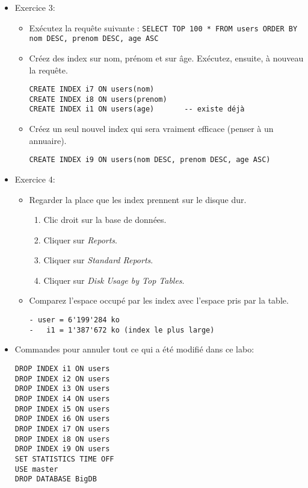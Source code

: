 \documentclass[a4paper]{article}
\begin{document}
\begin{itemize}
\item Exercice 3:
\begin{itemize}
\item Exécutez la requête suivante : \texttt{SELECT TOP 100 * FROM users ORDER BY nom DESC, prenom DESC, age ASC}
\item Créez des index sur nom, prénom et sur âge. Exécutez, ensuite, à nouveau la requête.
\begin{example} \begin{verbatim}
CREATE INDEX i7 ON users(nom)
CREATE INDEX i8 ON users(prenom)
CREATE INDEX i1 ON users(age)       -- existe déjà
\end{verbatim} \end{example}
\item Créez un seul nouvel index qui sera vraiment efficace (penser à un annuaire).
\begin{example} \begin{verbatim}
CREATE INDEX i9 ON users(nom DESC, prenom DESC, age ASC)
\end{verbatim} \end{example}
\end{itemize}



\item Exercice 4:
\begin{itemize}
\item Regarder la place que les index prennent sur le disque dur.
\begin{enumerate}
    \item Clic droit sur la base de données.
    \item Cliquer sur \textit{Reports}.
    \item Cliquer sur \textit{Standard Reports}.
    \item Cliquer sur \textit{Disk Usage by Top Tables}.
\end{enumerate}
\item Comparez l’espace occupé par les index avec l’espace pris par la table.
\begin{example} \begin{verbatim}
- user = 6'199'284 ko
-   i1 = 1'387'672 ko (index le plus large)
\end{verbatim} \end{example}
\end{itemize}



\item Commandes pour annuler tout ce qui a été modifié dans ce labo:
\begin{example} \begin{verbatim}
DROP INDEX i1 ON users
DROP INDEX i2 ON users
DROP INDEX i3 ON users
DROP INDEX i4 ON users
DROP INDEX i5 ON users
DROP INDEX i6 ON users
DROP INDEX i7 ON users
DROP INDEX i8 ON users
DROP INDEX i9 ON users
SET STATISTICS TIME OFF
USE master
DROP DATABASE BigDB
\end{verbatim} \end{example}



\end{itemize}
\end{document}
